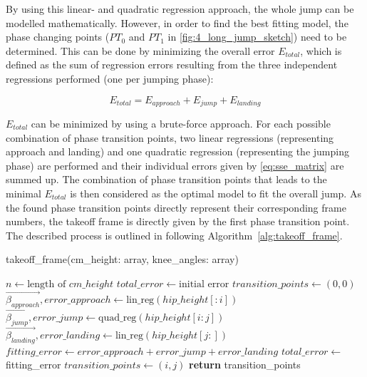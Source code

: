 \noindent By using this linear- and quadratic regression approach, the whole
jump can be modelled mathematically.
However, in order to find the best fitting model, the phase changing points
($PT_0$ and $PT_1$ in \autoref{fig:4_long_jump_sketch}) need to be determined.
This can be done by minimizing the overall error $E_{total}$, which is defined
as the sum of regression errors resulting from the three independent
regressions performed (one per jumping phase):

\begin{equation}\label{eq:total_error}
    E_{total} = E_{approach} + E_{jump} + E_{landing}
\end{equation}

\noindent $E_{total}$ can be minimized by using a brute-force approach.
For each possible combination of phase transition points, two linear
regressions (representing approach and landing) and one quadratic regression
(representing the jumping phase) are performed and their individual errors
given by \autoref{eq:sse_matrix} are summed up.
The combination of phase transition points that leads to the minimal
$E_{total}$ is then considered as the optimal model to fit the overall jump.
As the found phase transition points directly represent their corresponding
frame numbers, the takeoff frame is directly given by the first phase
transition point.\\
The described process is outlined in following
Algorithm~\ref{alg:takeoff_frame}.
\begin{algorithm}[h!]
    \caption{takeoff\_frame(cm\_height: array, knee\_angles: array)}
    \begin{algorithmic}[1]
        \State $n \gets \text{length of } cm\_height$
        \State $total\_error \gets \text{initial error}$
        \State $transition\_points \gets (0,0)$
            \State $\vec{\beta_{approach}}, error\_approach \gets \text{lin\_reg}(hip\_height[:i])$
            \State $\vec{\beta_{jump}}, error\_jump \gets \text{quad\_reg}(hip\_height[i:j])$
            \State $\vec{\beta_{landing}}, error\_landing \gets \text{lin\_reg}(hip\_height[j:])$
            \State $fitting\_error \gets error\_approach + error\_jump + error\_landing$
                    \State $total\_error \gets$ fitting\_error
                    \State $transition\_points \gets (i,j)$
                \EndIf
            \EndFor
        \EndFor
        \State \textbf{return} transition\_points
    \end{algorithmic}
\label{alg:takeoff_frame}
\end{algorithm}
\FloatBarrier

